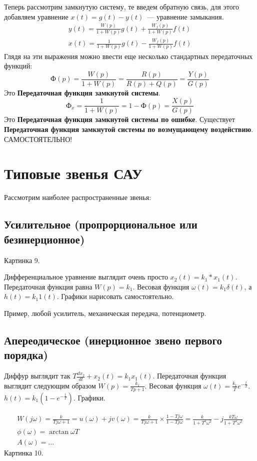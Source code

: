 Теперь рассмотрим замкнутую систему, те введем обратную связь, для этого добавляем уравнение $x(t)=g(t)-y(t)$~--- уравнение замыкания.
\begin{gather*}
	y(t)=\frac{W(p)}{1+W(p)}g(t)+\frac{W_f(p)}{1+W(p)}f(t) \\
	x(t)=\frac{1}{1+W(p)}g(t)-\frac{W_f(p)}{1+W(p)}f(t)
\end{gather*}
Глядя на эти выражения можно ввести еще несколько стандартных передаточных функций:
$$\text{Ф}(p)=\frac{W(p)}{1+W(p)}=\frac{R(p)}{R(p)+Q(p)}=\frac{Y(p)}{G(p)}$$
Это \textbf{Передаточная функция замкнутой системы}.
$$\text{Ф}_x=\frac{1}{1+W(p)}=1-\text{Ф}(p)=\frac{X(p)}{G(p)}$$
Это \textbf{Передаточная функция замкнутой системы по ошибке}.
Существует \textbf{Передаточная функция замкнутой системы по возмущающему воздействию}. САМОСТОЯТЕЛЬНО!

\section{Типовые звенья САУ}
Рассмотрим наиболее распространенные звенья:
\subsection{Усилительное (пропрорциональное или безинерционное)} 
	Картинка 9.
	
	Дифференциальное уравнение выглядит очень просто $x_2(t)=k_1*x_1(t)$. Передаточная функция равна $W(p)=k_1$. Весовая функция $\omega(t)=k_1\delta(t)$, а $h(t)=k_1{}1(t)$. Графики нарисовать самостоятельно.
	
	Пример, любой усилитель, механическая передача, потенциометр.
	
\subsection{Апереодическое (инерционное звено первого порядка)}
	Диффур выглядит так $T\frac{dx_2}{dt}+x_2(t)=k_1x_1(t)$. Передаточная функция выглядит следующим образом $W(p)=\frac{k_1}{Tp+1}$. Весовая функция $\omega(t)=\frac{k_1}{T}e^{-\frac{t}{T}}$. $h(t)=k_1(1-e^{-\frac{t}{T}})$. Графики.
	
	\begin{gather*}
		W(j\omega)=\frac{k}{Tj\omega+1}=u(\omega)+jv(\omega)=\frac{k}{Tj\omega+1}\times\frac{1-Tj\omega}{1-Tj\omega}=\frac{k}{1+T^2\omega^2}-j\frac{kT\omega}{1+T^2\omega^2}\\
		\phi(\omega)=\arctan\omega{}T\\
		A(\omega)=\ldots
	\end{gather*}
	Картинка 10.

